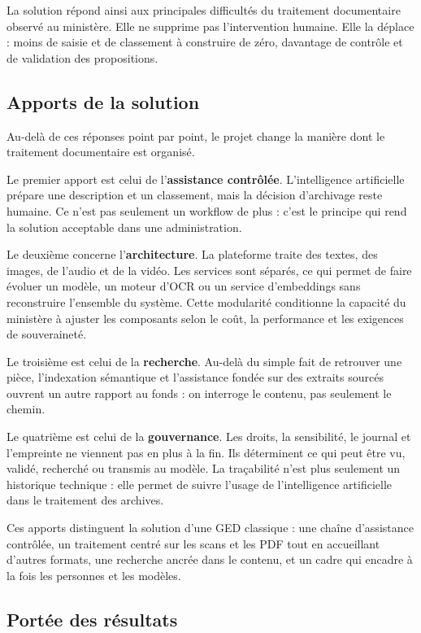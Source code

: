 La solution répond ainsi aux principales difficultés du traitement documentaire observé au ministère. Elle ne supprime pas l'intervention humaine. Elle la déplace : moins de saisie et de classement à construire de zéro, davantage de contrôle et de validation des propositions.

\subsection{Apports de la solution}

Au-delà de ces réponses point par point, le projet change la manière dont le traitement documentaire est organisé.

Le premier apport est celui de l'\textbf{assistance contrôlée}. L'intelligence artificielle prépare une description et un classement, mais la décision d'archivage reste humaine. Ce n'est pas seulement un workflow de plus : c'est le principe qui rend la solution acceptable dans une administration.

Le deuxième concerne l'\textbf{architecture}. La plateforme traite des textes, des images, de l'audio et de la vidéo. Les services sont séparés, ce qui permet de faire évoluer un modèle, un moteur d'OCR ou un service d'embeddings sans reconstruire l'ensemble du système. Cette modularité conditionne la capacité du ministère à ajuster les composants selon le coût, la performance et les exigences de souveraineté.

Le troisième est celui de la \textbf{recherche}. Au-delà du simple fait de retrouver une pièce, l'indexation sémantique et l'assistance fondée sur des extraits sourcés ouvrent un autre rapport au fonds : on interroge le contenu, pas seulement le chemin.

Le quatrième est celui de la \textbf{gouvernance}. Les droits, la sensibilité, le journal et l'empreinte ne viennent pas \og en plus\fg{} à la fin. Ils déterminent ce qui peut être vu, validé, recherché ou transmis au modèle. La traçabilité n'est plus seulement un historique technique : elle permet de suivre l'usage de l'intelligence artificielle dans le traitement des archives.

Ces apports distinguent la solution d'une GED classique : une chaîne d'assistance contrôlée, un traitement centré sur les scans et les PDF tout en accueillant d'autres formats, une recherche ancrée dans le contenu, et un cadre qui encadre à la fois les personnes et les modèles.

\subsection{Portée des résultats}

